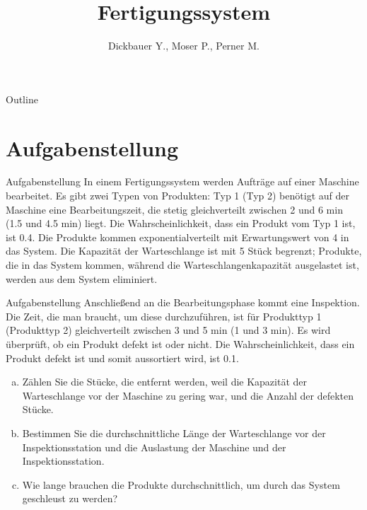

\title[BSP22 - Fertigungssystem]{Fertigungssystem}
\author{Dickbauer Y., Moser P., Perner M.}



\begin{frame}
  \titlepage
\end{frame}

\begin{frame}{Outline}
  \tableofcontents
\end{frame}

\section{Aufgabenstellung}
\begin{frame}{Aufgabenstellung}
In einem Fertigungssystem werden Aufträge auf einer Maschine bearbeitet. Es gibt zwei
Typen von Produkten: Typ 1 (Typ 2) benötigt auf der Maschine eine Bearbeitungszeit, die
stetig gleichverteilt zwischen 2 und 6 min (1.5 und 4.5 min) liegt. Die Wahrscheinlichkeit,
dass ein Produkt vom Typ 1 ist, ist 0.4. Die Produkte kommen exponentialverteilt mit
Erwartungswert von 4 in das System. Die Kapazität der Warteschlange ist mit 5 Stück
begrenzt; Produkte, die in das System kommen, während die Warteschlangenkapazität
ausgelastet ist, werden aus dem System eliminiert.
\end{frame}

\begin{frame}{Aufgabenstellung}
Anschließend an die Bearbeitungsphase kommt eine Inspektion. Die Zeit, die man braucht,
um diese durchzuführen, ist für Produkttyp 1 (Produkttyp 2) gleichverteilt zwischen 3
und 5 min (1 und 3 min). Es wird überprüft, ob ein Produkt defekt ist oder nicht. Die
Wahrscheinlichkeit, dass ein Produkt defekt ist und somit aussortiert wird, ist 0.1.
\begin{enumerate}[(a)]
\item Zählen Sie die Stücke, die entfernt werden, weil die Kapazität der Warteschlange vor
der Maschine zu gering war, und die Anzahl der defekten Stücke.
\item Bestimmen Sie die durchschnittliche Länge der Warteschlange vor der Inspektionsstation
und die Auslastung der Maschine und der Inspektionsstation.
\item Wie lange brauchen die Produkte durchschnittlich, um durch das System geschleust
zu werden?
\end{enumerate}
\end{frame}

